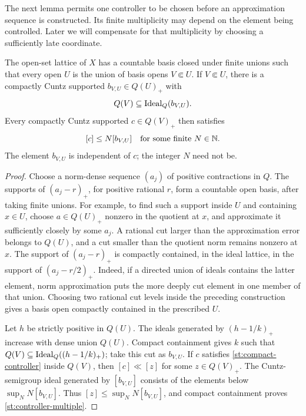 The next lemma permits one controller to be chosen before an
approximation sequence is constructed. Its finite multiplicity may
depend on the element being controlled. Later we will compensate for
that multiplicity by choosing a sufficiently late coordinate.

\begin{lemma}
\label{st:controllers}
The open-set lattice of \(X\) has a countable basis closed under
finite unions such that every open \(U\) is the union of basis opens
\(V\Subset U\). If \(V\Subset U\), there is a compactly Cuntz
supported \(b_{V,U}\in Q(U)_+\) with
\[
 Q(V)\subseteq\operatorname{Ideal}_Q(b_{V,U}).
\]
Every compactly Cuntz supported \(c\in Q(V)_+\) then satisfies
\begin{equation}\label{st:controller-multiple}
 [c]\leq N[b_{V,U}]
 \quad\hbox{for some finite }N\in\mathbb N.
\end{equation}
The element \(b_{V,U}\) is independent of \(c\); the integer
\(N\) need not be.
\end{lemma}

\begin{proof}
Choose a norm-dense sequence \((a_j)\) of positive contractions in
\(Q\). The supports of \((a_j-r)_+\), for positive rational
\(r\), form a countable open basis, after taking finite unions.
For example, to find such a support inside \(U\) and containing
\(x\in U\), choose \(a\in Q(U)_+\) nonzero in the quotient at
\(x\), and approximate it sufficiently closely by some \(a_j\).
A rational cut larger than the approximation error belongs to
\(Q(U)\), and a cut smaller than the quotient norm remains nonzero
at \(x\).
The support of \((a_j-r)_+\) is compactly contained, in the ideal
lattice, in the support of \((a_j-r/2)_+\). Indeed, if a directed
union of ideals contains the latter element, norm approximation
puts the more deeply cut element in one member of that union.
Choosing two rational cut levels inside the preceding construction
gives a basis open compactly contained in the prescribed \(U\).

Let \(h\) be strictly positive in \(Q(U)\). The ideals generated
by \((h-1/k)_+\) increase with dense union \(Q(U)\).
Compact containment gives \(k\) such that
\(Q(V)\subseteq\operatorname{Ideal}_Q((h-1/k)_+)\); take this cut as
\(b_{V,U}\). If \(c\) satisfies \eqref{st:compact-controller}
inside \(Q(V)\), then \([c]\ll[z]\) for some \(z\in Q(V)_+\).
The Cuntz-semigroup ideal generated by \([b_{V,U}]\) consists of
the elements below \(\sup_N N[b_{V,U}]\). Thus
\([z]\leq\sup_N N[b_{V,U}]\), and compact containment proves
\eqref{st:controller-multiple}.
\end{proof}

